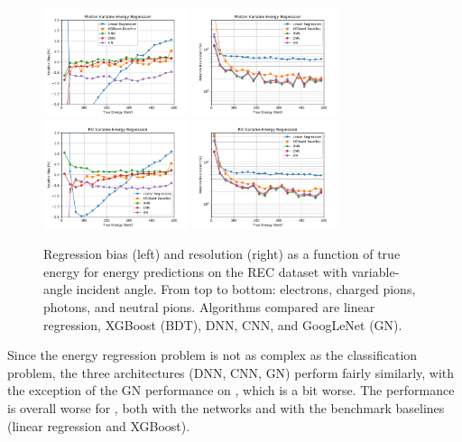 \begin{figure}[htbp]
\includegraphics[width=0.38\textwidth]{Images/Calo/bias_vs_E_Gamma_variable.pdf}
\includegraphics[width=0.38\textwidth]{Images/Calo/res_vs_E_Gamma_variable.pdf}\\
\includegraphics[width=0.38\textwidth]{Images/Calo/bias_vs_E_Pi0_variable.pdf}
\includegraphics[width=0.38\textwidth]{Images/Calo/res_vs_E_Pi0_variable.pdf}
\caption{Regression bias (left) and resolution (right) as a function
  of true energy for energy predictions on the REC dataset with
  variable-angle incident angle. From top to bottom: electrons,
  charged pions, photons, and neutral
  pions. Algorithms compared are linear regression, XGBoost (BDT), DNN, CNN, and GoogLeNet (GN).\label{fig:reg_dnn_vs_cnn_variable}}
\end{figure}

Since the energy regression problem is not as complex as the classification problem, the three architectures (DNN, CNN, GN) perform fairly similarly, with the exception of the GN performance on \chpi, which is a bit worse.
The performance is overall worse for \chpi, both with the networks and with the benchmark baselines (linear regression and XGBoost).

